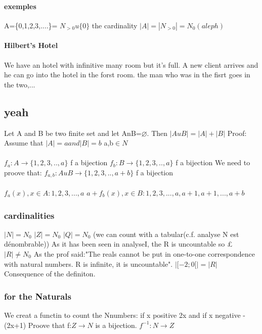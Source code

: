 \documentclass[a4paper,10pt]{article}
\begin{document}
{\paragraph{exemples}
A=\{0,1,2,3,....\}= $N_{>0}u\{0\}$
\newline
the cardinality $|A|=|N_{>0}|=N_0(aleph)$
\paragraph{Hilbert's Hotel}
We have an hotel with infinitive many room but it's full. A new client arrives and he can go into the hotel in the forst room. the man who was in the fisrt goes in the two,...
\subsection{yeah}
Let A and B be two finite set and let AnB=$\varnothing$. Then $|AuB|=|A|+|B|$
\newline
Proof:
\newline
Assume that $|A|=a and |B|=b$ a,b$\in N$
\paragraph{}
$f_a:A\rightarrow\{1,2,3,..,a\}$ f a bijection
\newline
$f_b:B\rightarrow\{1,2,3,..,a\}$ f a bijection
\newline
We need to proove that:
\newline
$f_{a,b}:AuB\rightarrow\{1,2,3,..,a+b\}$ f a bijection
\paragraph{}
$f_a(x), x\in A: 1,2,3,...,a$
\newline
$a+f_b(x), x\in B: 1,2,3,...,a,a+1,a+1,...,a+b$
\subsubsection{cardinalities}
$|N|=N_0$
\newline
$|Z|=N_0$
\newline
$|Q|=N_0$ (we can count with a tabular(c.f. analyse N est dénombrable))
\newline
As it has been seen in analyseI, the R is uncountable so £$|R|\neq N_0$ As the prof said:"The reals cannot be put in one-to-one correspondence with natural numbers. R is infinite, it is uncountable".
\newline
$|[-2;0[|=|R|$ Consequence of the definiton.
\subsubsection{for the Naturals}
We creat a functin to count the Nnumbers: if x positive 2x and if x negative -(2x+1)
\newline
Proove that f:$Z\rightarrow N$ is a bijection.
\newline
$f^{-1}:N\rightarrow Z$
}
\end{document}
